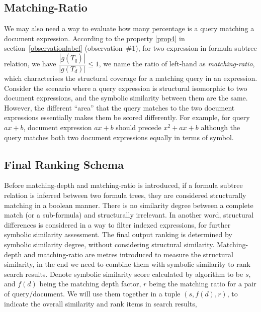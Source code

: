 \subsection{Matching-Ratio}
We may also need a way to evaluate how many percentage is a query matching a document expression.
According to the property \ref{prop4} in section~\ref{observationlabel} (observation~\#1), for two expression in formula subtree relation, we have $\dfrac{|g(T_q)|}{|g(T_d)|} \le 1$, 
we name the ratio of left-hand as \textit{matching-ratio}, which characterises the structural coverage for a matching query in an expression.
Consider the scenario where a query expression is structural isomorphic to two document expressions, and the symbolic similarity between them are the same.
However, the different ``area'' that the query matches to the two document expressions essentially makes them be scored differently.
For example, for query $ax + b$, document expression $ax + b$ should precede $x^2 + ax + b$ although the query matches both two document expressions equally in terms of symbol.

\subsection{Final Ranking Schema}
\label{rankingTuple}
Before matching-depth and matching-ratio is introduced, if a formula subtree relation is inferred between two formula trees, they are considered structurally matching in a boolean manner. 
There is no similarity degree between a complete match (or a sub-formula) and structurally irrelevant. 
In another word, structural differences is considered in a way to filter indexed expressions, for further symbolic similarity assessment. 
The final output ranking is determined by symbolic similarity degree, without considering structural similarity. 
Matching-depth and matching-ratio are metres introduced to measure the structural similarity, in the end we need to combine them with symbolic similarity to rank search results.
Denote symbolic similarity score calculated by  algorithm to be $s$, and $f(d)$ being the matching depth factor, $r$ being the matching ratio for a pair of query/document. 
We will use them together in a tuple $(s, f(d), r)$, to indicate the overall similarity and rank items in search results,


